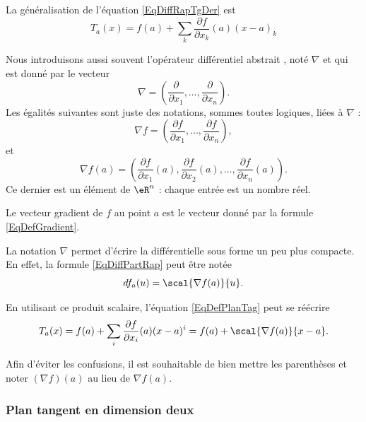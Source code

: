 La généralisation de l'équation \eqref{EqDiffRapTgDer} est
\begin{equation}        \label{EqDefPlanTag}
	T_a(x)=f(a)+\sum_k\frac{ \partial f }{ \partial x_k }(a)(x-a)_k
\end{equation}

Nous introduisons aussi souvent l'opérateur différentiel abstrait , noté \( \nabla\) et qui est donné par le vecteur
\begin{equation}
	\nabla=\left( \frac{ \partial  }{ \partial x_1 },\ldots,\frac{ \partial  }{ \partial x_n } \right).
\end{equation}
Les égalités suivantes sont juste des notations, sommes toutes logiques, liées à \( \nabla\) :
\begin{equation}
	\nabla f=\left( \frac{ \partial f }{ \partial x_1 },\ldots,\frac{ \partial f }{ \partial x_n } \right),
\end{equation}
et
\begin{equation}        \label{EqDefGradient}
	\nabla f(a) = \left(\frac{\partial f}{\partial x_1}(a), \frac{\partial f}{\partial x_2}(a), \ldots, \frac{\partial f}{\partial x_n}(a)\right).
\end{equation}
Ce dernier est un élément de \( \eR^n\) : chaque entrée est un nombre réel.

\begin{definition}
	Le vecteur gradient de \( f\) au point \( a\) est le vecteur donné par la formule \eqref{EqDefGradient}.
\end{definition}
La notation \( \nabla\) permet d'écrire la différentielle sous forme un peu plus compacte. En effet, la formule \eqref{EqDiffPartRap} peut être notée
\begin{equation}
	df_a(u)=\scal{\nabla f(a)}{u}.
\end{equation}

En utilisant ce produit scalaire, l'équation \eqref{EqDefPlanTag} peut se réécrire
\begin{equation}
	T_a(x)=f(a)+\sum_i\frac{ \partial f }{ \partial x_i }(a)(x-a)^i=f(a)+\scal{\nabla f(a)}{x-a}.
\end{equation}

Afin d'éviter les confusions, il est souhaitable de bien mettre les parenthèses et noter \( (\nabla f)(a)\) au lieu de \( \nabla f(a)\).


\subsubsection{Plan tangent en dimension deux}

